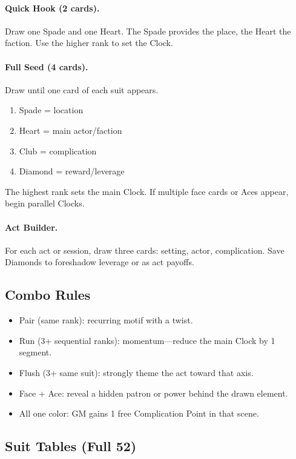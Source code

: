 \documentclass[12pt]{book}
\begin{document}
\paragraph{Quick Hook (2 cards).} Draw one Spade and one Heart. The Spade provides the place, the Heart the faction. Use the higher rank to set the Clock.

\paragraph{Full Seed (4 cards).} Draw until one card of each suit appears.
\begin{enumerate}
  \item Spade = location
  \item Heart = main actor/faction
  \item Club = complication
  \item Diamond = reward/leverage
\end{enumerate}
The highest rank sets the main Clock. If multiple face cards or Aces appear, begin parallel Clocks.

\paragraph{Act Builder.} For each act or session, draw three cards: setting, actor, complication. Save Diamonds to foreshadow leverage or as act payoffs.

\subsection{Combo Rules}
\begin{itemize}
  \item Pair (same rank): recurring motif with a twist.
  \item Run (3+ sequential ranks): momentum—reduce the main Clock by 1 segment.
  \item Flush (3+ same suit): strongly theme the act toward that axis.
  \item Face + Ace: reveal a hidden patron or power behind the drawn element.
  \item All one color: GM gains 1 free Complication Point in that scene.
\end{itemize}

\subsection{Suit Tables (Full 52)}
\end{document}
